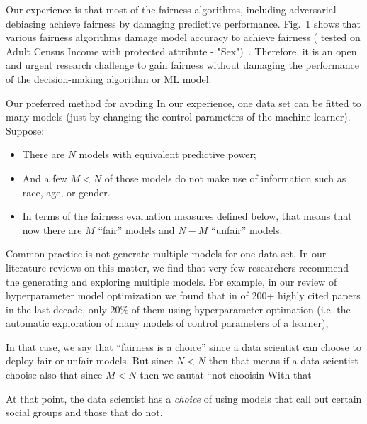 \documentclass{NSF}
\newenvironment{myitemize}
{ \begin{itemize}
    \setlength{\itemsep}{0pt}
    \setlength{\parskip}{0pt}
    \setlength{\parsep}{0pt}     }
{ \end{itemize}                  }
\newcommand{\bi}{\begin{myitemize}}
\newcommand{\ei}{\end{myitemize}}
\begin{document}
\begin{nsfdescription}
Our experience is that most of the fairness algorithms, including
adversarial debiasing   achieve fairness by damaging
predictive performance.  Fig.~1 shows that various fairness algorithms damage model accuracy to achieve fairness ( tested on  Adult Census Income with protected attribute - "Sex")~\cite{IBM}.
Therefore, it is an open and urgent research challenge to gain fairness without damaging the performance of the decision-making algorithm or ML model. 

Our preferred method for avoding 
In our experience, one data set can be fitted
to many models (just by changing the control parameters of the machine learner). Suppose:
\bi
\item
There are
$N$ models with equivalent predictive power;
\item
And a few  $M<N$ of those models do not make use of information
such as race, age, or gender. 
\item
In terms of the fairness evaluation measures defined below,
that means that now there are $M$ ``fair'' models and $N-M$ ``unfair'' models. 
\ei
Common practice is not generate multiple models for one data set. In our literature
reviews on this matter, we find that very few researchers recommend
the generating and exploring multiple
models. For example, in our review of  hyperparameter model optimization  we found that in of 200+ highly cited papers in the last decade,
only 20\% of them using hyperparameter optimation (i.e. the automatic exploration
of many models of control
parameters of a learner),

In that case, we say that ``fairness is a choice'' since a data scientist can choose
to deploy fair or unfair models. But since $N<N$ then that means if a data scientist
chooise also that since $M<N$ then we sautat
``not chooisin
With that 


At that point, the data scientist has a {\em choice} of using
models that call out certain social groups and those that do not. 




\end{nsfdescription}
\end{document}
